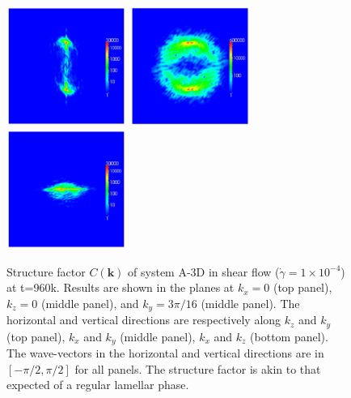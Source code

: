 \documentclass[8.5pt,twoside,twocolumn]{article}
\begin{document}
\begin{figure}[htp!]
\centering
\includegraphics[angle=0,width=0.35\textwidth]{ck_x-slice_run788_960.jpg}
\includegraphics[angle=0,width=0.35\textwidth]{ck_y-slice_run788_960.jpg}
\includegraphics[angle=0,width=0.35\textwidth]{ck_z-slice_run788_960.jpg}
\caption{Structure factor $C({\mathbf k})$ of system A-3D in shear flow ($\dot{\gamma}=1\times10^{-4}$) at t=960k. Results are shown in the planes at $k_x=0$ (top panel), $k_z=0$ (middle panel), and $k_y=3\pi/16$ (middle panel). 
The horizontal and vertical directions are respectively along $k_z$ and $k_y$ (top panel), $k_x$ and $k_y$ (middle panel), $k_x$ and $k_z$ (bottom panel). The wave-vectors in the horizontal and vertical directions are in $[-\pi/2 ,\pi/2]$ for all panels. The structure factor is akin to that expected of a regular lamellar phase.}
\label{fig12}
\end{figure}
\end{document}
